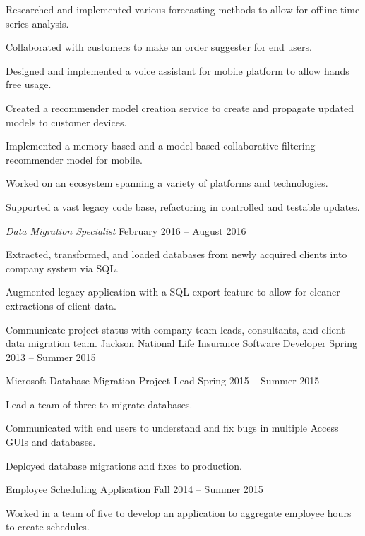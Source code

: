 \documentclass{marvinkassabian_resume}
\begin{document}
						\item Researched and implemented various forecasting methods to allow for offline time series analysis.
						\item Collaborated with customers to make an order suggester for end users.
						\item Designed and implemented a voice assistant for mobile platform to allow hands free usage. 
						\item Created a recommender model creation service to create and propagate updated models to customer devices.
						\item Implemented a memory based and a model based collaborative filtering recommender model for mobile.
						\item Worked on an ecosystem spanning a variety of platforms and technologies.
						\item Supported a vast legacy code base, refactoring in controlled and testable updates.
					\resumesublistend
				\item[] \subsectiondate
						{\textit{Data Migration Specialist}}
						{February 2016 – August 2016}
					\resumesublistbegin
						\item Extracted, transformed, and loaded databases from newly acquired clients into company system via SQL.
						\item Augmented legacy \cpp application with a SQL export feature to allow for cleaner extractions of client data.
						\item Communicate project status with company team leads, consultants, and client data migration team.
					\resumesublistend
			\resumesublistend
		\subsectionpositiondate
				{Jackson National Life Insurance}
				{Software Developer}
				{Spring 2013 – Summer 2015}
			\resumesublistbegin
				\item[] \subsectionlocationdate
						{Microsoft Database Migration}
						{Project Lead}
						{Spring 2015 – Summer 2015}
					\resumesublistbegin
						\item Lead a team of three to migrate databases.
						\item Communicated with end users to understand and fix bugs in multiple Access GUIs and databases.
						\item Deployed database migrations and fixes to production.
					\resumesublistend
				\item[] \subsectiondate
						{Employee Scheduling Application}
						{Fall 2014 – Summer 2015}
					\resumesublistbegin
						\item Worked in a team of five to develop an application to aggregate employee hours to create schedules.
\end{document}
